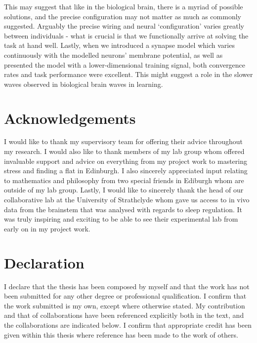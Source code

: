 \documentclass[mphil,deptreport,ianc]{infthesis} %
\begin{document}
\begin{preliminary}
This may suggest that like in the biological brain, there is a myriad of possible solutions, and the precise configuration may not matter as much as commonly suggested. Arguably the precise wiring and neural ‘configuration’ varies greatly between individuals - what is crucial is that we functionally arrive at solving the task at hand well.
Lastly, when we introduced a synapse model which varies continuously with the modelled neurons’ membrane potential, as well as presented the model with a lower-dimensional training signal, both convergence rates and task performance were excellent. This might suggest a role in the slower waves observed in biological brain waves in learning.
\clearpage

\section*{Acknowledgements}

I would like to thank my supervisory team for offering their advice throughout my research.
I would also like to thank members of my lab group whom offered invaluable support and advice on everything from my project work to mastering stress and finding a flat in Edinburgh.
I also sincerely appreciated input relating to mathematics and philosophy from two special friends in Ediburgh whom are outside of my lab group.
Lastly, I would like to sincerely thank the head of our collaborative lab at the University of Strathclyde whom gave us access to in vivo data from the brainstem that was analysed with regards to sleep regulation. It was truly inspiring and exciting to be able to see their experimental lab from early on in my project work.

\clearpage
\section*{Declaration}

I declare that the thesis has been composed by myself and that the work has not been submitted for any other degree or professional qualification. I confirm that the work submitted is my own, except where otherwise stated.
My contribution and that of collaborations have been referenced explicitly both in the text, and the collaborations are indicated below. I confirm that appropriate credit has been given within this thesis where reference has been made to the work of others.


\end{preliminary}
\end{document}
